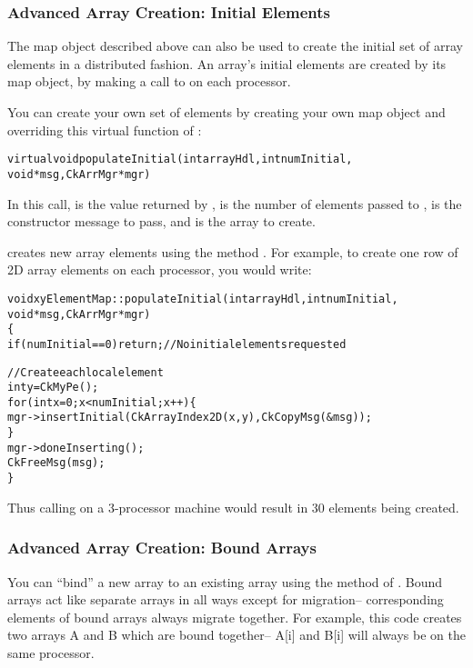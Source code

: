 \subsubsection{Advanced Array Creation: Initial Elements}

\label{array initial}

The map object described above can also be used to create
the initial set of array elements in a distributed fashion.
An array's initial elements are created by its map object,
by making a call to  on each processor.

You can create your own set of elements by creating your
own map object and overriding this virtual function of :

\begin{alltt}
  virtual void populateInitial(int arrayHdl,int numInitial,
	void *msg,CkArrMgr *mgr)
\end{alltt}

In this call,  is the value returned by ,
 is the number of elements passed to ,
 is the constructor message to pass, and  is the
array to create.

 creates new array elements using the method
.
For example, to create one row of 2D array elements on each processor,
you would write:

\begin{alltt}
void xyElementMap::populateInitial(int arrayHdl,int numInitial,
	void *msg,CkArrMgr *mgr)
\{
  if (numInitial==0) return; //No initial elements requested
	
  //Create each local element
  int y=CkMyPe();
  for (int x=0;x<numInitial;x++) \{
    mgr->insertInitial(CkArrayIndex2D(x,y),CkCopyMsg(&msg));
  \}
  mgr->doneInserting();
  CkFreeMsg(msg);
\}
\end{alltt}

Thus calling  on a 3-processor machine would result in
30 elements being created.


\subsubsection{Advanced Array Creation: Bound Arrays}

 
\label{bound arrays}
You can ``bind'' a new array to an existing array
using the  method of .  Bound arrays
act like separate arrays in all ways except for migration--
corresponding elements of bound arrays always migrate together.
For example, this code creates two arrays A and B which are
bound together-- A[i] and B[i] will always be on the same processor.

